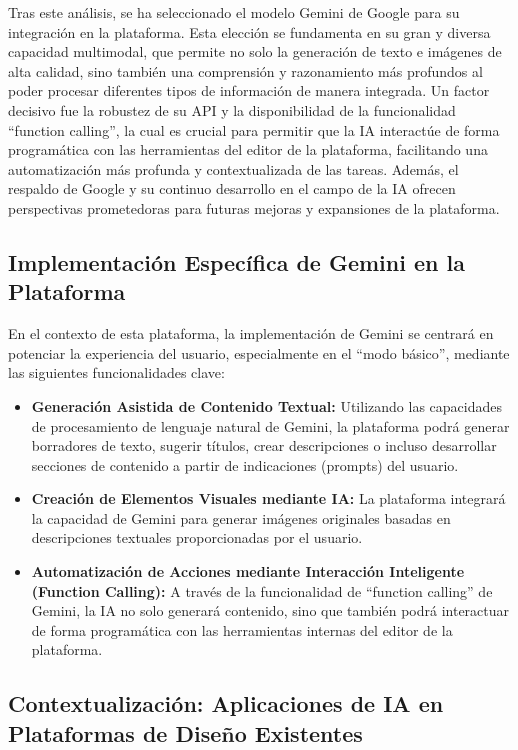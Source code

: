 \documentclass[12pt,a4paper]{report}
\begin{document}
Tras este análisis, se ha seleccionado el modelo Gemini de Google para su integración en la plataforma. Esta elección se fundamenta en su gran y diversa capacidad multimodal, que permite no solo la generación de texto e imágenes de alta calidad, sino también una comprensión y razonamiento más profundos al poder procesar diferentes tipos de información de manera integrada. Un factor decisivo fue la robustez de su API y la disponibilidad de la funcionalidad ``function calling'', la cual es crucial para permitir que la IA interactúe de forma programática con las herramientas del editor de la plataforma, facilitando una automatización más profunda y contextualizada de las tareas. Además, el respaldo de Google y su continuo desarrollo en el campo de la IA ofrecen perspectivas prometedoras para futuras mejoras y expansiones de la plataforma.

\subsection{Implementación Específica de Gemini en la Plataforma}

En el contexto de esta plataforma, la implementación de Gemini se centrará en potenciar la experiencia del usuario, especialmente en el ``modo básico'', mediante las siguientes funcionalidades clave:

\begin{itemize}
\item \textbf{Generación Asistida de Contenido Textual:} Utilizando las capacidades de procesamiento de lenguaje natural de Gemini, la plataforma podrá generar borradores de texto, sugerir títulos, crear descripciones o incluso desarrollar secciones de contenido a partir de indicaciones (prompts) del usuario.

\item \textbf{Creación de Elementos Visuales mediante IA:} La plataforma integrará la capacidad de Gemini para generar imágenes originales basadas en descripciones textuales proporcionadas por el usuario.

\item \textbf{Automatización de Acciones mediante Interacción Inteligente (Function Calling):} A través de la funcionalidad de ``function calling'' de Gemini, la IA no solo generará contenido, sino que también podrá interactuar de forma programática con las herramientas internas del editor de la plataforma.
\end{itemize}

\subsection{Contextualización: Aplicaciones de IA en Plataformas de Diseño Existentes}
\end{document}
